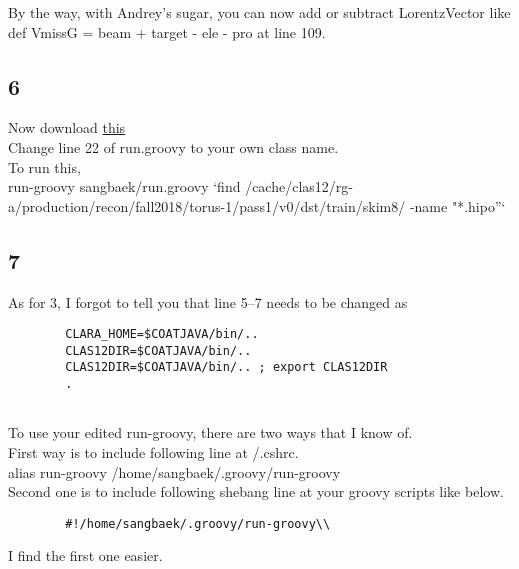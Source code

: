         By the way, with Andrey’s sugar, you can now add or subtract LorentzVector like def VmissG = beam + target - ele - pro at line 109.\\
        
    \subsection{6}
        Now download \href{https://github.com/Sangbaek/analysis_code/blob/analysis/sangbaek/run.groovy}{this}\\
        Change line 22 of run.groovy to your own class name.\\
        To run this,\\
        
        run-groovy sangbaek/run.groovy `find /cache/clas12/rg-a/production/recon/fall2018/torus-1/pass1/v0/dst/train/skim8/ -name "*.hipo”`
        
    \subsection{7}
        
        
        
        As for 3, I forgot to tell you that line 5–7 needs to be changed as
        
        \begin{lstlisting}
        CLARA_HOME=$COATJAVA/bin/..
        CLAS12DIR=$COATJAVA/bin/..
        CLAS12DIR=$COATJAVA/bin/.. ; export CLAS12DIR
        .
        
        \end{lstlisting}
        
        
        
        To use your edited run-groovy, there are two ways that I know of.\\
        
        First way is to include following line at \comtilde/.cshrc.\\
        alias run-groovy /home/sangbaek/.groovy/run-groovy\\
        
        Second one is to include following shebang line at your groovy scripts like below.\\
   
        \begin{lstlisting}     
        #!/home/sangbaek/.groovy/run-groovy\\
        \end{lstlisting}       
        
        I find the first one easier.
